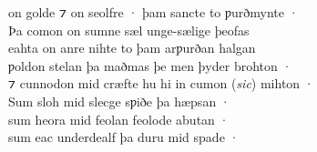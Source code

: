 \documentclass[10pt]{book}
\begin{document}
\begin{center}
{on golde ⁊ on seolfre · þam sancte to ƿurðmynte · \\
Þa comon on sumne s\ae{}l unge-s\ae{}lige þeofas \\
eahta on anre nihte to þam arƿurðan halgan \\
ƿoldon stelan þa maðmas þe men þyder brohton · \\
⁊ cunnodon mid cr\ae{}fte hu hi in cumon (\emph{sic}) mihton · \\
Sum sloh mid slecge sƿiðe þa h\ae{}psan · \\
sum heora mid feolan feolode abutan · \\
sum eac underdealf þa duru mid spade · \\
}
\end{center}

\settowidth{}
\end{document}
